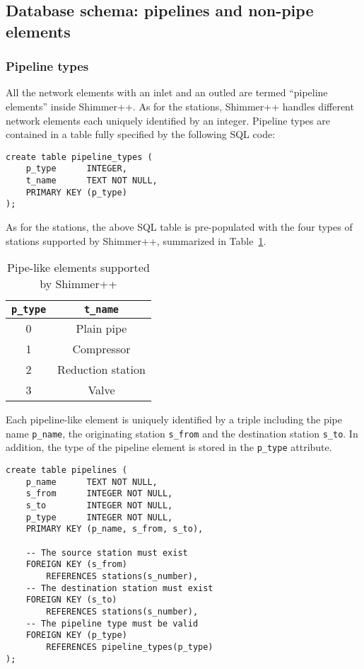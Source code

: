 \subsection{Database schema: pipelines and non-pipe elements}
\subsubsection{Pipeline types}
All the network elements with an inlet and an outled are termed ``pipeline elements''
inside Shimmer++. As for the stations, Shimmer++ handles different network elements
each uniquely identified by an integer. Pipeline types are contained in a table
fully specified by the following SQL code:
\begin{verbatim}
create table pipeline_types (
    p_type      INTEGER,
    t_name      TEXT NOT NULL,
    PRIMARY KEY (p_type)
);
\end{verbatim}

As for the stations, the above SQL table is pre-populated with the four types
of stations supported by Shimmer++, summarized in Table~\ref{tbl:pipetypes}.
\begin{table}[ht]
    \centering
    \begin{tabular}{c|c}
        \texttt{p\_type} & \texttt{t\_name} \\
        \hline
        0 & Plain pipe \\
        1 & Compressor \\
        2 & Reduction station \\
        3 & Valve \\
    \end{tabular}
    \caption{Pipe-like elements supported by Shimmer++}
    \label{tbl:pipetypes}
\end{table}

Each pipeline-like element is uniquely identified by a triple including the pipe
name \texttt{p\_name}, the originating station \texttt{s\_from} and the destination
station \texttt{s\_to}. In addition, the type of the pipeline element is stored
in the \texttt{p\_type} attribute. 
\begin{verbatim}
create table pipelines (
    p_name      TEXT NOT NULL,
    s_from      INTEGER NOT NULL,
    s_to        INTEGER NOT NULL,    
    p_type      INTEGER NOT NULL,
    PRIMARY KEY (p_name, s_from, s_to),

    -- The source station must exist
    FOREIGN KEY (s_from)
        REFERENCES stations(s_number),
    -- The destination station must exist
    FOREIGN KEY (s_to)
        REFERENCES stations(s_number),
    -- The pipeline type must be valid
    FOREIGN KEY (p_type)
        REFERENCES pipeline_types(p_type)
);
\end{verbatim}
